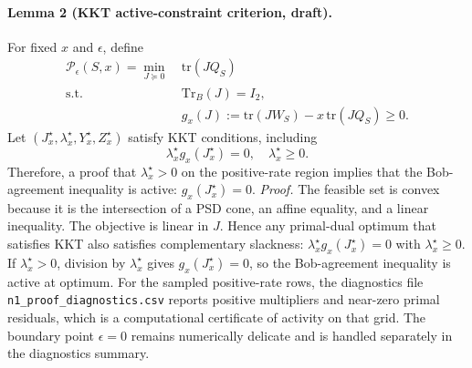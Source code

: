 \documentclass[a4paper,twocolumn,11pt,unpublished]{quantumarticle}
\newcommand{\PP}{\ensuremath{\mathcal{P}}}
\begin{document}
\paragraph{Lemma 2 (KKT active-constraint criterion, draft).}
For fixed $x$ and $\epsilon$, define
\begin{equation}
    \begin{split}
        \PP_\epsilon(S,x)=\min_{J \succeq 0}\ &\mathrm{tr}(JQ_S)\\
        \mathrm{s.t.}\quad &\mathrm{Tr}_B(J)=I_2,\\
        &g_x(J):=
        \mathrm{tr}(JW_S)-x\,\mathrm{tr}(JQ_S)\ge 0.
    \end{split}
\end{equation}
Let $(J_x^\star,\lambda_x^\star,Y_x^\star,Z_x^\star)$ satisfy KKT conditions,
including
\begin{equation}
\lambda_x^\star g_x(J_x^\star)=0,\quad \lambda_x^\star \ge 0.
\end{equation}
Therefore, a proof that $\lambda_x^\star>0$ on the positive-rate region implies
that the Bob-agreement inequality is active:
$g_x(J_x^\star)=0$.
{\color{magenta}
\textit{Proof.}
The feasible set is convex because it is the intersection of a PSD cone, an
affine equality, and a linear inequality. The objective is linear in $J$.
Hence any primal-dual optimum that satisfies KKT also satisfies complementary
slackness:
$\lambda_x^\star g_x(J_x^\star)=0$ with $\lambda_x^\star\ge 0$.
If $\lambda_x^\star>0$, division by $\lambda_x^\star$ gives
$g_x(J_x^\star)=0$, so the Bob-agreement inequality is active at optimum.
For the sampled positive-rate rows, the diagnostics file
\texttt{n1\_proof\_diagnostics.csv} reports positive multipliers and
near-zero primal residuals, which is a computational certificate of activity on
that grid. The boundary point $\epsilon=0$ remains numerically delicate and is
handled separately in the diagnostics summary.
}
\end{document}
